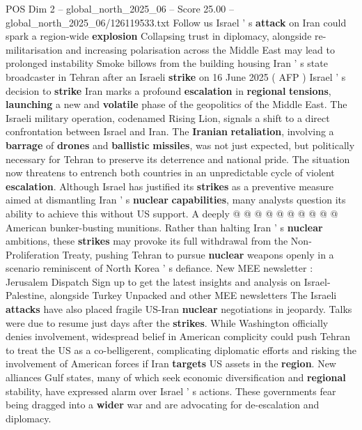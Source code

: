 \begin{textsample}{POS Dim 2 – global\_north\_2025\_06 – Score 25.00 – global\_north\_2025\_06/126119533.txt}  \label{ex:f2_pos_352}
Follow us Israel ' s \textbf{attack} on Iran could spark a region-wide \textbf{explosion} Collapsing trust in diplomacy, alongside re-militarisation and increasing polarisation across the Middle East may lead to prolonged instability Smoke billows from the building housing Iran ' s state broadcaster in Tehran after an Israeli \textbf{strike} on 16 June 2025 ( AFP ) Israel ' s decision to \textbf{strike} Iran marks a profound \textbf{escalation} in \textbf{regional} \textbf{tensions}, \textbf{launching} a new and \textbf{volatile} phase of the geopolitics of the Middle East.
The Israeli military operation, codenamed Rising Lion, signals a shift to a direct confrontation between Israel and Iran.
The \textbf{Iranian} \textbf{retaliation}, involving a \textbf{barrage} of \textbf{drones} and \textbf{ballistic} \textbf{missiles}, was not just expected, but politically necessary for Tehran to preserve its deterrence and national pride.
The situation now threatens to entrench both countries in an unpredictable cycle of violent \textbf{escalation}.
Although Israel has justified its \textbf{strikes} as a preventive measure aimed at dismantling Iran ' s \textbf{nuclear} \textbf{capabilities}, many analysts question its ability to achieve this without US support.
A deeply @ @ @ @ @ @ @ @ @ @ American bunker-busting munitions.
Rather than halting Iran ' s \textbf{nuclear} ambitions, these \textbf{strikes} may provoke its full withdrawal from the Non-Proliferation Treaty, pushing Tehran to pursue \textbf{nuclear} weapons openly in a scenario reminiscent of North Korea ' s defiance.
New MEE newsletter : Jerusalem Dispatch Sign up to get the latest insights and analysis on Israel-Palestine, alongside Turkey Unpacked and other MEE newsletters The Israeli \textbf{attacks} have also placed fragile US-Iran \textbf{nuclear} negotiations in jeopardy.
Talks were due to resume just days after the \textbf{strikes}.
While Washington officially denies involvement, widespread belief in American complicity could push Tehran to treat the US as a co-belligerent, complicating diplomatic efforts and risking the involvement of American forces if Iran \textbf{targets} US assets in the \textbf{region}.
New alliances Gulf states, many of which seek economic diversification and \textbf{regional} stability, have expressed alarm over Israel ' s actions.
These governments fear being dragged into a \textbf{wider} war and are advocating for de-escalation and diplomacy.

\end{textsample}
